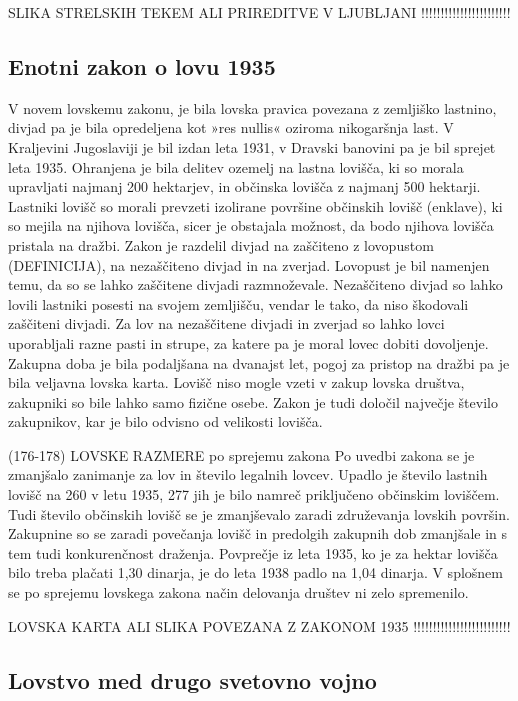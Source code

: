 \documentclass[a4paper,12pt,openright]{book}
\begin{document}
SLIKA STRELSKIH TEKEM ALI PRIREDITVE V LJUBLJANI !!!!!!!!!!!!!!!!!!!!!!!

\subsection{Enotni zakon o lovu 1935}
 
V novem lovskemu zakonu, je bila lovska pravica povezana z zemljiško lastnino, divjad pa je bila opredeljena kot »res nullis« oziroma nikogaršnja last.
V Kraljevini Jugoslaviji je bil izdan leta 1931, v Dravski banovini pa je bil sprejet leta 1935. 
Ohranjena je bila delitev ozemelj na lastna lovišča, ki so morala upravljati najmanj 200 hektarjev, in občinska lovišča z najmanj 500 hektarji.
Lastniki lovišč so morali prevzeti izolirane površine občinskih lovišč (enklave), ki so mejila na njihova lovišča, sicer je obstajala možnost, da bodo njihova lovišča pristala na dražbi. 
Zakon je razdelil divjad na zaščiteno z lovopustom (DEFINICIJA), na nezaščiteno divjad in na zverjad. 
Lovopust je bil namenjen temu, da so se lahko zaščitene divjadi razmnoževale. 
Nezaščiteno divjad so lahko lovili lastniki posesti na svojem zemljišču, vendar le tako, da niso škodovali zaščiteni divjadi.
Za lov na nezaščitene divjadi in zverjad so lahko lovci uporabljali razne pasti in strupe, za katere pa je moral lovec dobiti dovoljenje.
Zakupna doba je bila podaljšana na dvanajst let, pogoj za pristop na dražbi pa je bila veljavna lovska karta.
Lovišč niso mogle vzeti v zakup lovska društva, zakupniki so bile lahko samo fizične osebe. Zakon je tudi določil največje število zakupnikov, kar je bilo odvisno od velikosti lovišča.

(176-178) LOVSKE RAZMERE po sprejemu zakona
Po uvedbi zakona se je zmanjšalo zanimanje za lov in število legalnih lovcev.
Upadlo je število lastnih lovišč na 260 v letu 1935, 277 jih je bilo namreč priključeno občinskim loviščem.
Tudi število občinskih lovišč se je zmanjševalo zaradi združevanja lovskih površin. 
Zakupnine so se zaradi povečanja lovišč in predolgih zakupnih dob zmanjšale in s tem tudi konkurenčnost draženja.
Povprečje iz leta 1935, ko je za hektar lovišča bilo treba plačati 1,30 dinarja, je do leta 1938 padlo na 1,04 dinarja.
V splošnem se po sprejemu lovskega zakona način delovanja društev ni zelo spremenilo. 

LOVSKA KARTA ALI SLIKA POVEZANA Z ZAKONOM 1935 !!!!!!!!!!!!!!!!!!!!!!!!!

\subsection{Lovstvo med drugo svetovno vojno}
\end{document}
